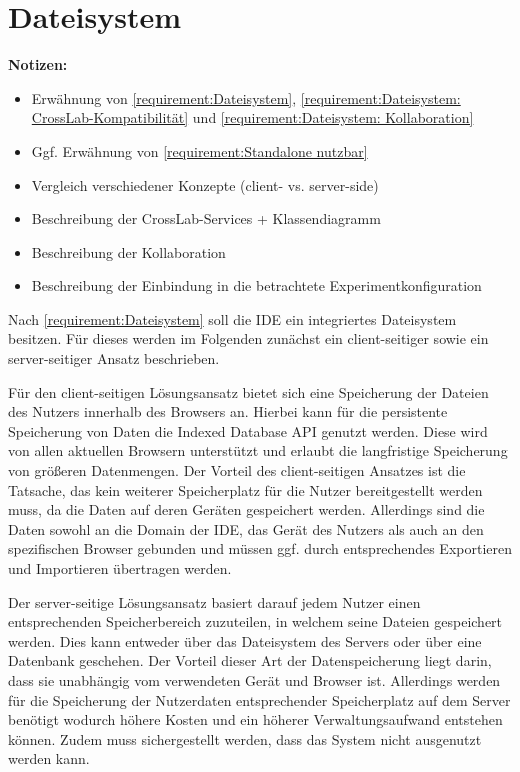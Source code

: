 \section{Dateisystem}\label{section:konzeption:dateisystem}

\begin{note}
    \textbf{Notizen:}
    \begin{itemize}
        \item Erwähnung von \autoref{requirement:Dateisystem}, \autoref{requirement:Dateisystem: CrossLab-Kompatibilität} und \autoref{requirement:Dateisystem: Kollaboration}
        \item Ggf. Erwähnung von \autoref{requirement:Standalone nutzbar}
        \item Vergleich verschiedener Konzepte (client- vs. server-side)
        \item Beschreibung der CrossLab-Services + Klassendiagramm
        \item Beschreibung der Kollaboration
        \item Beschreibung der Einbindung in die betrachtete Experimentkonfiguration
    \end{itemize}
\end{note}

Nach \autoref{requirement:Dateisystem} soll die IDE ein integriertes Dateisystem besitzen. Für dieses werden im Folgenden zunächst ein client-seitiger sowie ein server-seitiger Ansatz beschrieben.

Für den client-seitigen Lösungsansatz bietet sich eine Speicherung der Dateien des Nutzers innerhalb des Browsers an. Hierbei kann für die persistente Speicherung von Daten die Indexed Database API \cite{noauthor_indexed-database-api_nodate} genutzt werden. Diese wird von allen aktuellen Browsern unterstützt und erlaubt die langfristige Speicherung von größeren Datenmengen. Der Vorteil des client-seitigen Ansatzes ist die Tatsache, das kein weiterer Speicherplatz für die Nutzer bereitgestellt werden muss, da die Daten auf deren Geräten gespeichert werden. Allerdings sind die Daten sowohl an die Domain der IDE, das Gerät des Nutzers als auch an den spezifischen Browser gebunden und müssen ggf. durch entsprechendes Exportieren und Importieren übertragen werden.

Der server-seitige Lösungsansatz basiert darauf jedem Nutzer einen entsprechenden Speicherbereich zuzuteilen, in welchem seine Dateien gespeichert werden. Dies kann entweder über das Dateisystem des Servers oder über eine Datenbank geschehen. Der Vorteil dieser Art der Datenspeicherung liegt darin, dass sie unabhängig vom verwendeten Gerät und Browser ist. Allerdings werden für die Speicherung der Nutzerdaten entsprechender Speicherplatz auf dem Server benötigt wodurch höhere Kosten und ein höherer Verwaltungsaufwand entstehen können. Zudem muss sichergestellt werden, dass das System nicht ausgenutzt werden kann.

